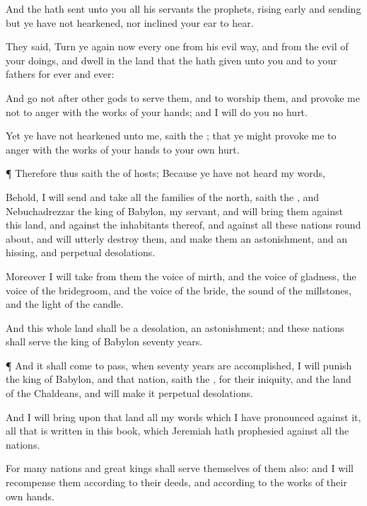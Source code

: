 {And the
{} hath
sent unto you all his
servants the
prophets, rising
early and
sending
{} but ye have not
hearkened, nor
inclined your
ear to
hear.

They
said, Turn ye
again now every
one from his
evil
way, and from the
evil of your
doings, and
dwell in the
land that the
{} hath
given unto you and to your
fathers
for
ever and
ever:

And
go not
after
other
gods to
serve them, and to
worship them, and provoke me not to
anger with the
works of your
hands; and I will do you no
hurt.

Yet ye have not
hearkened unto me,
saith the
{}; that ye might provoke me to
anger with the
works of your
hands to your own
hurt.


\par }{\PP {}¶ Therefore thus
saith the
{} of
hosts; Because ye have not
heard my
words,

Behold, I will
send and
take all the
families of the
north,
saith the
{}, and
Nebuchadrezzar the
king of
Babylon, my
servant, and will
bring them against this
land, and against the
inhabitants thereof, and against all these
nations round
about, and will utterly
destroy them, and
make them an
astonishment, and an
hissing, and
perpetual
desolations.

Moreover I will
take from them the
voice of
mirth, and the
voice of
gladness, the
voice of the
bridegroom, and the
voice of the
bride, the
sound of the
millstones, and the
light of the
candle.

And this whole
land shall be a
desolation,
{} an
astonishment; and these
nations shall
serve the
king of
Babylon
seventy
years.


\par }{\PP {}¶ And it shall come to pass, when
seventy
years are
accomplished,
{} I will
punish the
king of
Babylon, and that
nation,
saith the
{}, for their
iniquity, and the
land of the
Chaldeans, and will
make it
perpetual
desolations.

And I will
bring upon that
land all my
words which I have
pronounced against it,
{} all that is
written in this
book, which
Jeremiah hath
prophesied against all the
nations.

For
many
nations and
great
kings shall
serve themselves of them also: and I will
recompense them according to their
deeds, and according to the
works of their own
hands.


}
